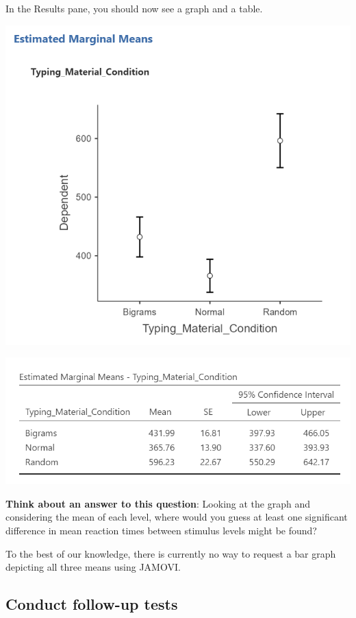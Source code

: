 \documentclass[
]{book}
\begin{document}
In the Results pane, you should now see a graph and a table.

\includegraphics{img/RM_ANOVA_GraphOfMeans_Results.png}

\includegraphics{img/RM_ANOVA_EMMTable_Results.png}

\textbf{Think about an answer to this question}: Looking at the graph and considering the mean of each level, where would you guess at least one significant difference in mean reaction times between stimulus levels might be found?

To the best of our knowledge, there is currently no way to request a bar graph depicting all three means using JAMOVI.

\hypertarget{conduct-follow-up-tests}{%
\subsection{Conduct follow-up tests}\label{conduct-follow-up-tests}}
\end{document}
